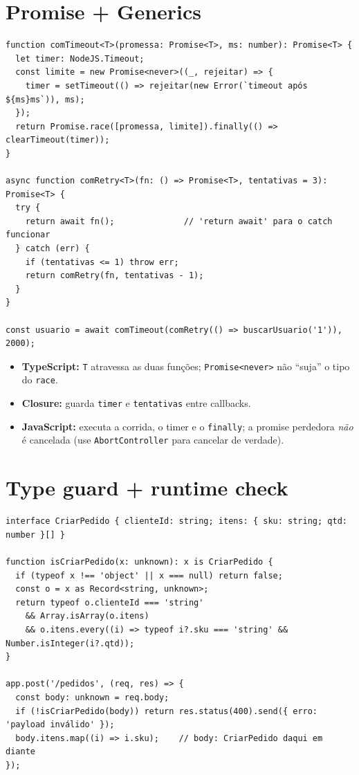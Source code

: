 \documentclass[12pt,a4paper,oneside]{book}
\newcommand{\code}[1]{\texttt{#1}}
\begin{document}
\section{Promise + Generics}

\begin{verbatim}
function comTimeout<T>(promessa: Promise<T>, ms: number): Promise<T> {
  let timer: NodeJS.Timeout;
  const limite = new Promise<never>((_, rejeitar) => {
    timer = setTimeout(() => rejeitar(new Error(`timeout após ${ms}ms`)), ms);
  });
  return Promise.race([promessa, limite]).finally(() => clearTimeout(timer));
}

async function comRetry<T>(fn: () => Promise<T>, tentativas = 3): Promise<T> {
  try {
    return await fn();              // 'return await' para o catch funcionar
  } catch (err) {
    if (tentativas <= 1) throw err;
    return comRetry(fn, tentativas - 1);
  }
}

const usuario = await comTimeout(comRetry(() => buscarUsuario('1')), 2000);
\end{verbatim}

\begin{itemize}
  \item \textbf{TypeScript:} \code{T} atravessa as duas funções; \code{Promise<never>} não ``suja'' o tipo do \code{race}.
  \item \textbf{Closure:} guarda \code{timer} e \code{tentativas} entre callbacks.
  \item \textbf{JavaScript:} executa a corrida, o timer e o \code{finally}; a promise perdedora \emph{não} é cancelada (use \code{AbortController} para cancelar de verdade).
\end{itemize}

\section{Type guard + runtime check}

\begin{verbatim}
interface CriarPedido { clienteId: string; itens: { sku: string; qtd: number }[] }

function isCriarPedido(x: unknown): x is CriarPedido {
  if (typeof x !== 'object' || x === null) return false;
  const o = x as Record<string, unknown>;
  return typeof o.clienteId === 'string'
    && Array.isArray(o.itens)
    && o.itens.every((i) => typeof i?.sku === 'string' && Number.isInteger(i?.qtd));
}

app.post('/pedidos', (req, res) => {
  const body: unknown = req.body;
  if (!isCriarPedido(body)) return res.status(400).send({ erro: 'payload inválido' });
  body.itens.map((i) => i.sku);    // body: CriarPedido daqui em diante
});
\end{verbatim}
\end{document}
